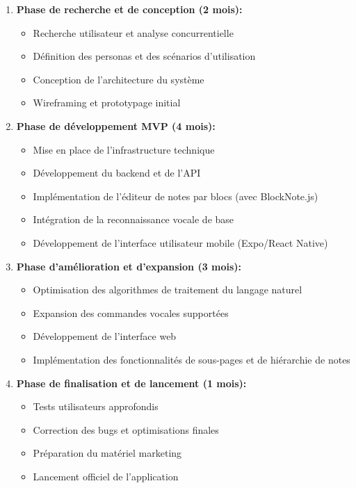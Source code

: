 \begin{enumerate}
    \item \textbf{Phase de recherche et de conception (2 mois):}
    \begin{itemize}
        \item Recherche utilisateur et analyse concurrentielle
        \item Définition des personas et des scénarios d'utilisation
        \item Conception de l'architecture du système
        \item Wireframing et prototypage initial
    \end{itemize}
    
    \item \textbf{Phase de développement MVP (4 mois):}
    \begin{itemize}
        \item Mise en place de l'infrastructure technique
        \item Développement du backend et de l'API
        \item Implémentation de l'éditeur de notes par blocs (avec BlockNote.js)
        \item Intégration de la reconnaissance vocale de base
        \item Développement de l'interface utilisateur mobile (Expo/React Native)
    \end{itemize}
    
    \item \textbf{Phase d'amélioration et d'expansion (3 mois):}
    \begin{itemize}
        \item Optimisation des algorithmes de traitement du langage naturel
        \item Expansion des commandes vocales supportées
        \item Développement de l'interface web
        \item Implémentation des fonctionnalités de sous-pages et de hiérarchie de notes
    \end{itemize}
    
    \item \textbf{Phase de finalisation et de lancement (1 mois):}
    \begin{itemize}
        \item Tests utilisateurs approfondis
        \item Correction des bugs et optimisations finales
        \item Préparation du matériel marketing
        \item Lancement officiel de l'application
    \end{itemize}
\end{enumerate}

